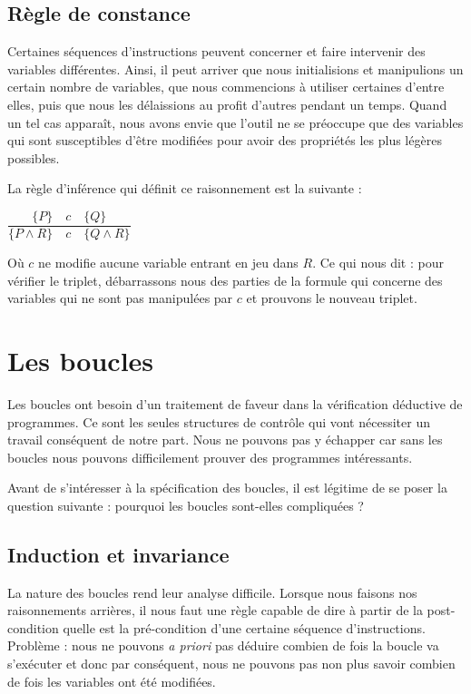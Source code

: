 \documentclass[12pt,francais,]{scrbook}
\begin{document}
\subsection{Règle de constance}\label{ruxe8gle-de-constance}

Certaines séquences d'instructions peuvent concerner et faire intervenir
des variables différentes. Ainsi, il peut arriver que nous initialisions
et manipulions un certain nombre de variables, que nous commencions à
utiliser certaines d'entre elles, puis que nous les délaissions au
profit d'autres pendant un temps. Quand un tel cas apparaît, nous avons
envie que l'outil ne se préoccupe que des variables qui sont
susceptibles d'être modifiées pour avoir des propriétés les plus légères
possibles.

La règle d'inférence qui définit ce raisonnement est la suivante :

\begin{center}
\(\dfrac{\{P\}\quad c\quad \{Q\}}{\{P \wedge R\}\quad c\quad \{Q \wedge R\}}\)
\end{center}

Où \(c\) ne modifie aucune variable entrant en jeu dans \(R\). Ce qui
nous dit : \og{}pour vérifier le triplet, débarrassons nous des parties de
la formule qui concerne des variables qui ne sont pas manipulées par
\(c\) et prouvons le nouveau triplet\fg{}.

\section{Les boucles}\label{les-boucles}

Les boucles ont besoin d'un traitement de faveur dans la vérification
déductive de programmes. Ce sont les seules structures de contrôle qui
vont nécessiter un travail conséquent de notre part. Nous ne pouvons pas
y échapper car sans les boucles nous pouvons difficilement prouver des
programmes intéressants.

Avant de s'intéresser à la spécification des boucles, il est légitime de
se poser la question suivante : pourquoi les boucles sont-elles
compliquées ?

\subsection{Induction et invariance}\label{induction-et-invariance}

La nature des boucles rend leur analyse difficile. Lorsque nous faisons
nos raisonnements arrières, il nous faut une règle capable de dire à
partir de la post-condition quelle est la pré-condition d'une certaine
séquence d'instructions. Problème : nous ne pouvons \emph{a priori} pas
déduire combien de fois la boucle va s'exécuter et donc par conséquent,
nous ne pouvons pas non plus savoir combien de fois les variables ont
été modifiées.
\end{document}
